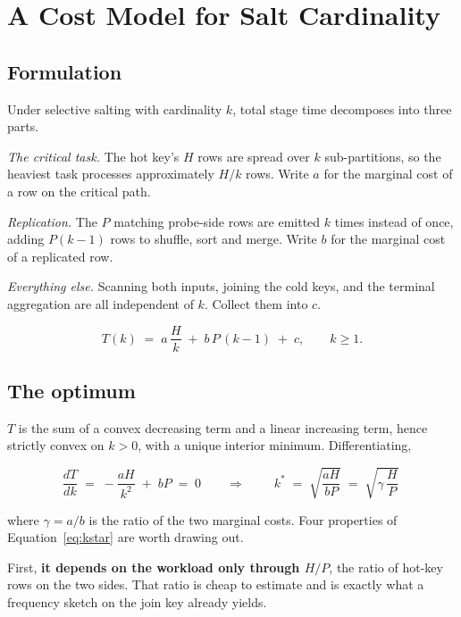 \section{A Cost Model for Salt Cardinality}
\label{sec:costmodel}

\subsection{Formulation}

Under selective salting with cardinality $k$, total stage time decomposes into
three parts.

\emph{The critical task.} The hot key's $H$ rows are spread over $k$
sub-partitions, so the heaviest task processes approximately $H/k$ rows. Write
$a$ for the marginal cost of a row on the critical path.

\emph{Replication.} The $P$ matching probe-side rows are emitted $k$ times
instead of once, adding $P(k-1)$ rows to shuffle, sort and merge. Write $b$ for
the marginal cost of a replicated row.

\emph{Everything else.} Scanning both inputs, joining the cold keys, and the
terminal aggregation are all independent of $k$. Collect them into $c$.

\begin{equation}
T(k) \;=\; a\,\frac{H}{k} \;+\; b\,P\,(k-1) \;+\; c ,
\qquad k \ge 1 .
\label{eq:model}
\end{equation}

\subsection{The optimum}

$T$ is the sum of a convex decreasing term and a linear increasing term, hence
strictly convex on $k>0$, with a unique interior minimum. Differentiating,

\begin{equation}
\frac{dT}{dk} \;=\; -\frac{aH}{k^{2}} \;+\; bP \;=\; 0
\qquad\Longrightarrow\qquad
\boxed{\;k^{*} \;=\; \sqrt{\frac{aH}{bP}} \;=\; \sqrt{\gamma\,\frac{H}{P}}\;}
\label{eq:kstar}
\end{equation}

where $\gamma = a/b$ is the ratio of the two marginal costs. Four properties of
Equation~\eqref{eq:kstar} are worth drawing out.

First, \textbf{it depends on the workload only through $H/P$}, the ratio of
hot-key rows on the two sides. That ratio is cheap to estimate and is exactly
what a frequency sketch on the join key already yields.

